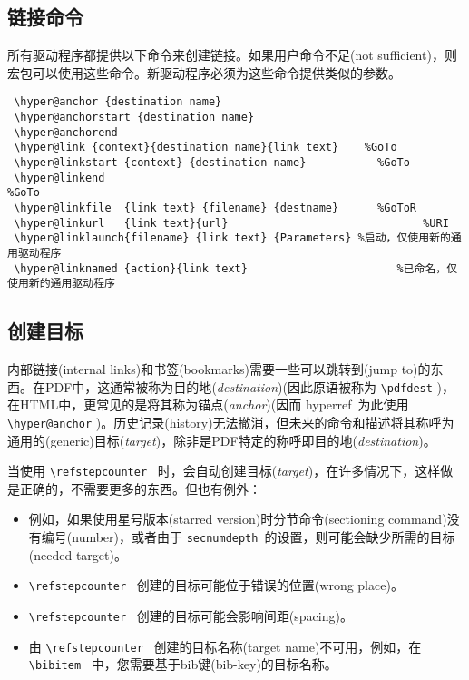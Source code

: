 \documentclass{article}
\newcommand*{\cs}[1]{%
  \texttt{\textbackslash #1}%
}
\newcommand*{\xpackage}[1]{\textsf{#1}}
\begin{document}
\subsection[链接命令]{\heiti 链接命令}
所有驱动程序都提供以下命令来创建链接。如果用户命令不足(not sufficient)，则宏包可以使用这些命令。新驱动程序必须为这些命令提供类似的参数。

\begin{verbatim}
 \hyper@anchor {destination name}
 \hyper@anchorstart {destination name}
 \hyper@anchorend
 \hyper@link {context}{destination name}{link text}    %GoTo
 \hyper@linkstart {context} {destination name}           %GoTo
 \hyper@linkend                                                     %GoTo
 \hyper@linkfile  {link text} {filename} {destname}      %GoToR
 \hyper@linkurl   {link text}{url}                              %URI
 \hyper@linklaunch{filename} {link text} {Parameters} %启动，仅使用新的通用驱动程序
 \hyper@linknamed {action}{link text}                       %已命名，仅使用新的通用驱动程序
\end{verbatim}

\subsection[创建目标]{\heiti 创建目标}

内部链接(internal links)和书签(bookmarks)需要一些可以跳转到(jump to)的东西。在PDF中，这通常被称为{\kaiti 目的地}(\emph{destination})(因此原语被称为 \cs{pdfdest})，在HTML中，更常见的是将其称为{\kaiti 锚点}(\emph{anchor})(因而 \xpackage{hyperref}\ 为此使用 \cs{hyper@anchor})。历史记录(history)无法撤消，但未来的命令和描述将其称呼为通用的(generic){\kaiti 目标}(\emph{target})，除非是PDF特定的称呼即{\kaiti 目的地}(\emph{destination})。

当使用 \cs{refstepcounter}\ 时，会自动创建{\kaiti 目标}(\emph{target})，在许多情况下，这样做是正确的，不需要更多的东西。但也有例外：
\begin{itemize}
  \item 例如，如果使用星号版本(starred version)时分节命令(sectioning command)没有编号(number)，或者由于 \texttt{secnumdepth}\ 的设置，则可能会缺少所需的目标(needed target)。
  \item \cs{refstepcounter}\ 创建的目标可能位于错误的位置(wrong place)。
  \item \cs{refstepcounter}\ 创建的目标可能会影响间距(spacing)。
  \item 由 \cs{refstepcounter}\ 创建的目标名称(target name)不可用，例如，在 \cs{bibitem}\ 中，您需要基于bib键(bib-key)的目标名称。
\end{itemize}
\end{document}

